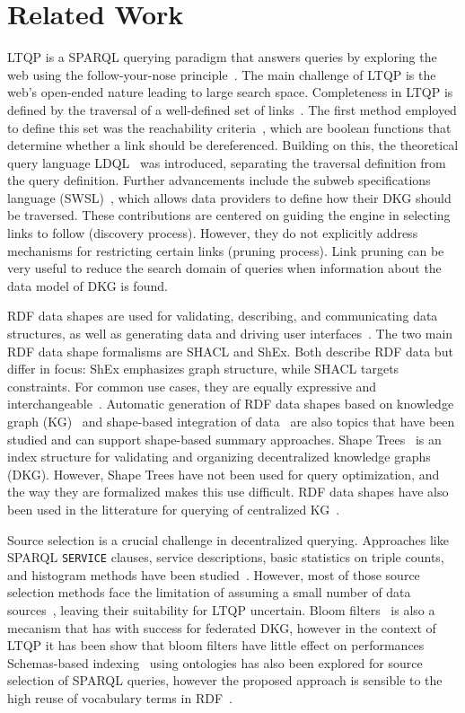 \section{Related Work}

LTQP is a SPARQL querying paradigm that answers queries by exploring the web using the follow-your-nose principle~\cite{hartig2016walking}.
The main challenge of LTQP is the web's open-ended nature leading to large search space.
Completeness in LTQP is defined by the traversal of a well-defined set of links~\cite{Hartig2012}.
The first method employed to define this set was the reachability criteria~\cite{Hartig2012}, which are boolean functions that determine whether a link should be dereferenced.
Building on this, the theoretical query language LDQL~\cite{hartigLDQL} was introduced, separating the traversal definition from the query definition.
Further advancements include the subweb specifications language (SWSL)~\cite{Bogaerts2021LinkTW}, which allows data providers to define how their DKG should be traversed.
These contributions are centered on guiding the engine in selecting links to follow (discovery process).
However, they do not explicitly address mechanisms for restricting certain links (pruning process).
Link pruning can be very useful to reduce the search domain of queries when information about the data model of DKG is found.

RDF data shapes are used for validating, describing, and communicating data structures, as well as generating data and driving user interfaces~\cite{Gayo2018a,Gayo2018}.
The two main RDF data shape formalisms are SHACL and ShEx.
Both describe RDF data but differ in focus: ShEx emphasizes graph structure, while SHACL targets constraints.
For common use cases, they are equally expressive and interchangeable~\cite{Gayo2018c}.
Automatic generation of RDF data shapes based on knowledge graph (KG)~\cite{fernandez2023extracting} and shape-based integration of data~\cite{LabraGayo2023} are also topics that have been studied and can support shape-based summary approaches.
Shape Trees~\cite{shapetreesShapeTrees} is an index structure for validating and organizing decentralized knowledge graphs (DKG).
However, Shape Trees have not been used for query optimization, and the way they are formalized makes this use difficult.
RDF data shapes have also been used in the litterature for querying of centralized KG~\cite{kashif2021}.

Source selection is a crucial challenge in decentralized querying.
Approaches like SPARQL \texttt{SERVICE} clauses, service descriptions, basic statistics on triple counts, and histogram methods have been studied~\cite{hose2012towards, Harth2010}.
However, most of those source selection methods face the limitation of assuming a small number of data sources~\cite{Harth2010}, leaving their suitability for LTQP uncertain.
Bloom filters~\cite{dia2018fast} is also a mecanism that has with success for federated DKG, however in the context of LTQP it has been show that bloom filters have little effect on performances~\cite{Hanski2024}
Schemas-based indexing~\cite{Stuckenschmidt2004} using ontologies has also been explored for source selection of SPARQL queries,
however the proposed approach is sensible to the high reuse of vocabulary terms in RDF~\cite{Harth2010}.
